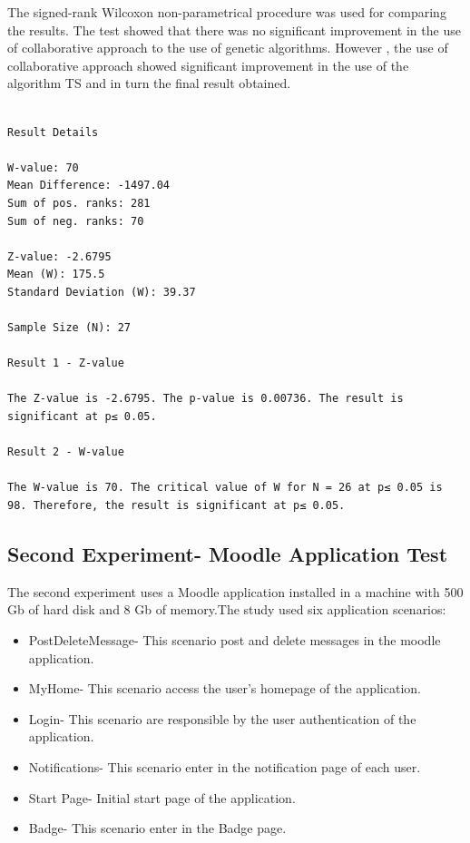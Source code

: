 The signed-rank Wilcoxon non-parametrical procedure was used for comparing the results. The test showed that there was no significant improvement in the use of collaborative approach to the use of genetic algorithms. However , the use of collaborative approach showed significant improvement in the use of the algorithm TS and in turn the final result obtained.

\begin{lstlisting}[style=outline,caption={Result obtained by the  Wilcoxon test with the results of TS Colab and TS No},float,label=classsimulated]

Result Details

W-value: 70
Mean Difference: -1497.04
Sum of pos. ranks: 281
Sum of neg. ranks: 70

Z-value: -2.6795
Mean (W): 175.5
Standard Deviation (W): 39.37

Sample Size (N): 27

Result 1 - Z-value

The Z-value is -2.6795. The p-value is 0.00736. The result is significant at p≤ 0.05.

Result 2 - W-value

The W-value is 70. The critical value of W for N = 26 at p≤ 0.05 is 98. Therefore, the result is significant at p≤ 0.05.
\end{lstlisting}


\subsection{Second Experiment- Moodle Application Test}

The second experiment uses a Moodle application installed in a machine with 500 Gb of hard disk and 8 Gb of memory.The study used six application scenarios:

\begin{itemize}
\item PostDeleteMessage- This scenario post and delete messages in the moodle application.
\item MyHome- This scenario access the user's homepage of the application.
\item Login- This scenario are responsible by the user authentication of the application.
\item Notifications- This scenario enter in the notification page of each user.
\item Start Page- Initial start page of the application.
\item Badge- This scenario enter in the Badge page.
\end{itemize}

